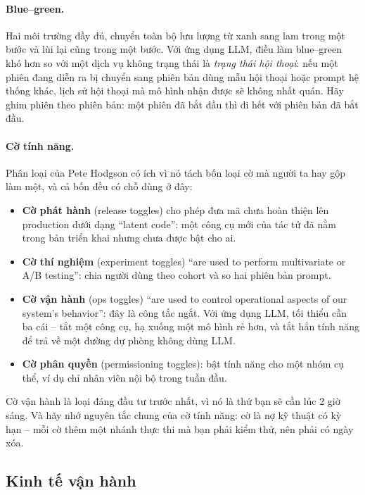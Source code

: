 \paragraph{Blue--green.} Hai môi trường đầy đủ, chuyển toàn bộ lưu lượng từ xanh sang lam trong một bước và lùi lại cũng trong một bước. Với ứng dụng LLM, điều làm blue--green khó hơn so với một dịch vụ không trạng thái là \emph{trạng thái hội thoại}: nếu một phiên đang diễn ra bị chuyển sang phiên bản dùng mẫu hội thoại hoặc prompt hệ thống khác, lịch sử hội thoại mà mô hình nhận được sẽ không nhất quán. Hãy ghim phiên theo phiên bản: một phiên đã bắt đầu thì đi hết với phiên bản đã bắt đầu.

\paragraph{Cờ tính năng.} Phân loại của Pete Hodgson \cite{hodgson2017featuretoggles} có ích vì nó tách bốn loại cờ mà người ta hay gộp làm một, và cả bốn đều có chỗ dùng ở đây:

\begin{itemize}
	\item \textbf{Cờ phát hành} (release toggles) cho phép đưa mã chưa hoàn thiện lên production dưới dạng ``latent code'': một công cụ mới của tác tử đã nằm trong bản triển khai nhưng chưa được bật cho ai.
	\item \textbf{Cờ thí nghiệm} (experiment toggles) ``are used to perform multivariate or A/B testing'': chia người dùng theo cohort và so hai phiên bản prompt.
	\item \textbf{Cờ vận hành} (ops toggles) ``are used to control operational aspects of our system's behavior'': đây là công tắc ngắt. Với ứng dụng LLM, tối thiểu cần ba cái -- tắt một công cụ, hạ xuống một mô hình rẻ hơn, và tắt hẳn tính năng để trả về một đường dự phòng không dùng LLM.
	\item \textbf{Cờ phân quyền} (permissioning toggles): bật tính năng cho một nhóm cụ thể, ví dụ chỉ nhân viên nội bộ trong tuần đầu.
\end{itemize}

\noindent Cờ vận hành là loại đáng đầu tư trước nhất, vì nó là thứ bạn sẽ cần lúc 2 giờ sáng. Và hãy nhớ nguyên tắc chung của cờ tính năng: cờ là nợ kỹ thuật có kỳ hạn -- mỗi cờ thêm một nhánh thực thi mà bạn phải kiểm thử, nên phải có ngày xóa.

\subsection{Kinh tế vận hành}
\label{ssec:llm_economics}


